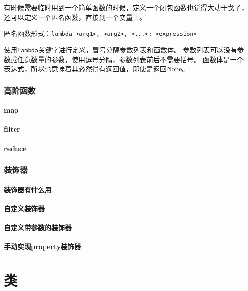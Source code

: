 \documentclass{ctexbook}
\begin{document}
有时候需要临时用到一个简单函数的时候，定义一个闭包函数也觉得大动干戈了，还可以定义一个匿名函数，直接到一个变量上。

匿名函数形式：\verb|lambda <arg1>, <arg2>, <...>: <expression>|

使用\verb|lambda|关键字进行定义，冒号分隔参数列表和函数体。
参数列表可以没有参数或任意数量的参数，使用逗号分隔，参数列表前后不需要括号。
函数体是一个表达式，所以也意味着其必然得有返回值，即使是返回None。

\section{高阶函数}

	\subsection{map}
	\subsection{filter}
	\subsection{reduce}

\section{装饰器}

	\subsection{装饰器有什么用}
	\subsection{自定义装饰器}
	\subsection{自定义带参数的装饰器}
	\subsection{手动实现property装饰器}

\part{类}
\end{document}
